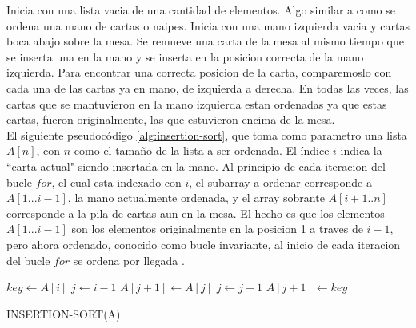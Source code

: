 \documentclass{article}
\begin{document}
		            Inicia con una lista vacia de una cantidad de elementos. Algo similar a como se ordena una mano de cartas o naipes. Inicia con una mano izquierda vacia y cartas boca abajo sobre la mesa. Se remueve una carta de la mesa al mismo tiempo que se inserta una en la mano y se inserta en la posicion correcta de la mano izquierda. Para encontrar una correcta posicion de la carta, comparemoslo con cada una de las cartas ya en mano, de izquierda a derecha. En todas las veces, las cartas que se mantuvieron en la mano izquierda estan ordenadas ya que estas cartas, fueron originalmente, las que estuvieron encima de la mesa.
		            \\
		            El siguiente pseudocódigo \ref{alg:insertion-sort}, que toma como parametro una lista $A[n]$, con $n$ como el tamaño de la lista a ser ordenada. El índice $i$ indica la ``carta actual" siendo insertada en la mano. Al principio de cada iteracion del bucle $for$, el cual esta indexado con $i$, el subarray a ordenar corresponde a $A[1...i-1]$, la mano actualmente ordenada, y el array sobrante $A[i+1..n]$ corresponde a la pila de cartas aun en la mesa. El hecho es que los elementos $A[1...i-1]$ son los elementos originalmente en la posicion 1 a traves de $i-1$, pero ahora ordenado, conocido como bucle invariante, al inicio de cada iteracion del bucle $for$ se ordena por llegada \cite{CLRS2009}.
		         
		            \begin{algorithm}[H]
                        \begin{algorithmic}[1]
                                \STATE $key \gets A[i]$
                                \STATE $j \gets i-1$
                                    \STATE $A[j + 1] \gets A[j]$ 
                                    \STATE $j \gets j - 1$
                                \ENDWHILE
                                \STATE $A[j + 1] \gets key$
                            \ENDFOR
                        \end{algorithmic}
                        \caption{INSERTION-SORT(A)}
                        \label{alg:insertion-sort}
                    \end{algorithm}
                    
\end{document}

